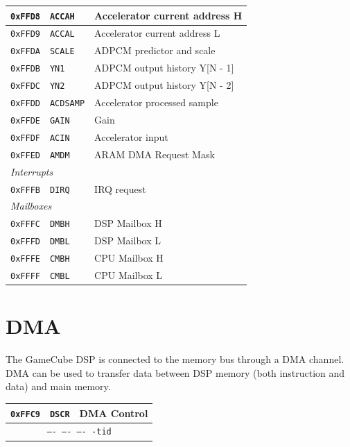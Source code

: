 \documentclass[oneside,english,a4paper,10pt,oneside,openany,final]{memoir}
\newcommand{\Address}[1]{\texttt{#1}}
\newcommand{\Register}[1]{\texttt{#1}}
\newcommand{\RegisterBitOverview}[4]{
  \begin{table}[H]
  \centering
  \begin{tabular}{|lcr|}
  \hline
  \Address{#1} & \Register{#2} & {#3} \\ \hline
  \multicolumn{3}{|c|}{\texttt{#4}}   \\ \hline
  \end{tabular}
  \end{table}
}
\begin{document}
\begin{table}[htb]
\begin{tabular}{|l|l|l|}
\Address{0xFFD8} & \Register{ACCAH}   & Accelerator current address H \\ \hline
\Address{0xFFD9} & \Register{ACCAL}   & Accelerator current address L \\ \hline
\Address{0xFFDA} & \Register{SCALE}   & ADPCM predictor and scale     \\ \hline
\Address{0xFFDB} & \Register{YN1}     & ADPCM output history Y[N - 1] \\ \hline
\Address{0xFFDC} & \Register{YN2}     & ADPCM output history Y[N - 2] \\ \hline
\Address{0xFFDD} & \Register{ACDSAMP} & Accelerator processed sample  \\ \hline
\Address{0xFFDE} & \Register{GAIN}    & Gain                          \\ \hline
\Address{0xFFDF} & \Register{ACIN}    & Accelerator input             \\ \hline
\Address{0xFFED} & \Register{AMDM}    & ARAM DMA Request Mask         \\ \hline
\multicolumn{3}{|l|}{\textit{Interrupts}}                             \\ \hline
\Address{0xFFFB} & \Register{DIRQ}    & IRQ request                   \\ \hline
\multicolumn{3}{|l|}{\textit{Mailboxes}}                              \\ \hline
\Address{0xFFFC} & \Register{DMBH}    & DSP Mailbox H                 \\ \hline
\Address{0xFFFD} & \Register{DMBL}    & DSP Mailbox L                 \\ \hline
\Address{0xFFFE} & \Register{CMBH}    & CPU Mailbox H                 \\ \hline
\Address{0xFFFF} & \Register{CMBL}    & CPU Mailbox L                 \\ \hline
\end{tabular}
\end{table}

\pagebreak{}

\section{DMA}

The GameCube DSP is connected to the memory bus through a DMA channel. DMA can be used to transfer data between DSP memory (both instruction and data) and main memory.

\RegisterBitOverview{0xFFC9}{DSCR}{DMA Control}{---- ---- ---- -tid}
\end{document}
